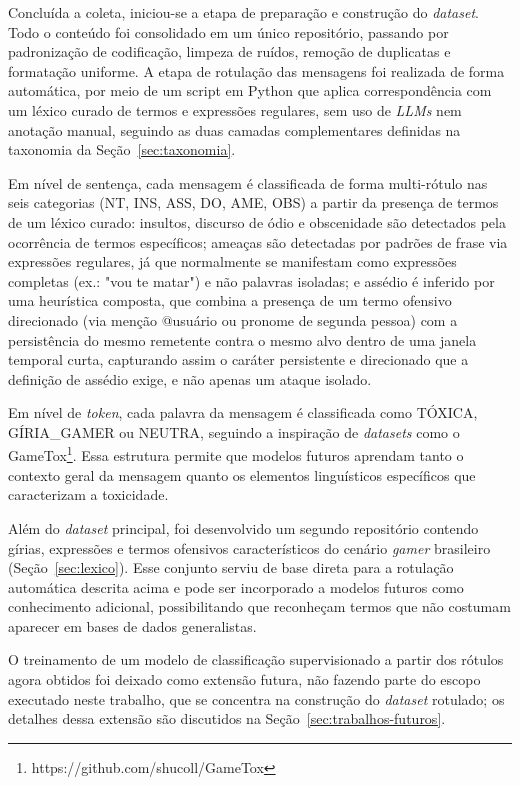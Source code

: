 \documentclass{eic-bcc-tcc}
\begin{document}
Concluída a coleta, iniciou-se a etapa de preparação e construção do \textit{dataset}. Todo o conteúdo foi consolidado em um único repositório, passando por padronização de codificação, limpeza de ruídos, remoção de duplicatas e formatação uniforme. A etapa de rotulação das mensagens foi realizada de forma automática, por meio de um script em Python que aplica correspondência com um léxico curado de termos e expressões regulares, sem uso de \textit{LLMs} nem anotação manual, seguindo as duas camadas complementares definidas na taxonomia da Seção~\ref{sec:taxonomia}.

Em nível de sentença, cada mensagem é classificada de forma multi-rótulo nas seis categorias (NT, INS, ASS, DO, AME, OBS) a partir da presença de termos de um léxico curado: insultos, discurso de ódio e obscenidade são detectados pela ocorrência de termos específicos; ameaças são detectadas por padrões de frase via expressões regulares, já que normalmente se manifestam como expressões completas (ex.: "vou te matar") e não palavras isoladas; e assédio é inferido por uma heurística composta, que combina a presença de um termo ofensivo direcionado (via menção @usuário ou pronome de segunda pessoa) com a persistência do mesmo remetente contra o mesmo alvo dentro de uma janela temporal curta, capturando assim o caráter persistente e direcionado que a definição de assédio exige, e não apenas um ataque isolado.

Em nível de \textit{token}, cada palavra da mensagem é classificada como TÓXICA, GÍRIA\_GAMER ou NEUTRA, seguindo a inspiração de \textit{datasets} como o GameTox\footnote{https://github.com/shucoll/GameTox}. Essa estrutura permite que modelos futuros aprendam tanto o contexto geral da mensagem quanto os elementos linguísticos específicos que caracterizam a toxicidade.


Além do \textit{dataset} principal, foi desenvolvido um segundo repositório contendo gírias, expressões e termos ofensivos característicos do cenário \textit{gamer} brasileiro (Seção~\ref{sec:lexico}). Esse conjunto serviu de base direta para a rotulação automática descrita acima e pode ser incorporado a modelos futuros como conhecimento adicional, possibilitando que reconheçam termos que não costumam aparecer em bases de dados generalistas.

O treinamento de um modelo de classificação supervisionado a partir dos rótulos agora obtidos foi deixado como extensão futura, não fazendo parte do escopo executado neste trabalho, que se concentra na construção do \textit{dataset} rotulado; os detalhes dessa extensão são discutidos na Seção~\ref{sec:trabalhos-futuros}.
\end{document}
